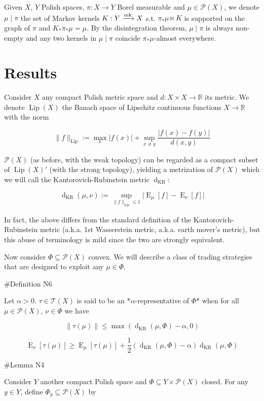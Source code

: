\documentclass[a4paper]{article}
\DeclareMathOperator{\E}{E}
\newcommand{\Reals}{\mathbb{R}}
\newcommand{\Abs}[1]{\lvert #1 \rvert}
\newcommand{\Norm}[1]{\lVert #1 \rVert}
\newcommand{\Markov}{\xrightarrow{\textnormal{mk}}}
\newcommand{\Prob}{\mathcal{P}}
\newcommand{\T}{\mathcal{T}}
\newcommand{\Lip}{\operatorname{Lip}}
\newcommand{\NormL}[1]{\Norm{#1}_{\operatorname{Lip}}}
\newcommand{\Dkr}{\operatorname{d}_{\text{KR}}}
\begin{document}
Given ${X}$, ${Y}$ Polish spaces, ${\pi: X \rightarrow Y}$ Borel measurable and ${\mu \in \Prob(X)}$, we denote ${\mu \mid \pi}$ the set of Markov kernels ${K: Y \Markov X}$ s.t. ${\pi_* \mu \ltimes K}$ is supported on the graph of ${\pi}$ and ${K_*\pi_* \mu = \mu}$. By the disintegration theorem, ${\mu \mid \pi}$ is always non-empty and any two kernels in ${\mu \mid \pi}$ coincide ${\pi_*\mu}$-almost everywhere.

\section{Results}

Consider ${X}$ any compact Polish metric space and ${d: X \times X \rightarrow \Reals}$ its metric. We denote ${\Lip(X)}$ the Banach space of Lipschitz continuous functions ${X \rightarrow \Reals}$ with the norm

$$\NormL{f}:=\max_{x} \Abs{f(x)} + \sup_{x \ne y}\frac{\Abs{f(x)-f(y)}}{d(x,y)}$$

${\Prob(X)}$ (as before, with the weak topology) can be regarded as a compact subset of ${\Lip(X)'}$ (with the strong topology), yielding a metrization of ${\Prob(X)}$ which we will call the Kantorovich-Rubinstein metric ${\Dkr}$:

$$\Dkr(\mu,\nu):=\sup_{\NormL{f} \leq 1} \Abs{\E_\mu[f] - \E_\nu[f]}$$

In fact, the above differs from the standard definition of the Kantorovich-Rubinstein metric (a.k.a. 1st Wasserstein metric, a.k.a. earth mover's metric), but this abuse of terminology is mild since the two are strongly equivalent.

Now consider ${\Phi \subseteq \Prob(X)}$ convex. We will describe a class of trading strategies that are designed to exploit any ${\mu \in \Phi}$.

\#Definition N6

Let $\alpha > 0$. ${\tau \in \T(X)}$ is said to be an *$\alpha$-representative of $\Phi$* when for all ${\mu \in \Prob(X)}$, ${\nu \in \Phi}$ we have

$$\Norm{\tau(\mu)} \leq \max(\Dkr(\mu,\Phi) - \alpha, 0)$$

$$\E_\nu[\tau(\mu)] \geq \E_\mu[\tau(\mu)] + \frac{1}{2}(\Dkr(\mu,\Phi) - \alpha)\Dkr(\mu,\Phi)$$

\#Lemma N4

Consider ${Y}$ another compact Polish space and ${\Phi \subseteq Y \times \Prob(X)}$ closed. For any ${y \in Y}$, define ${\Phi_y \subseteq \Prob(X)}$ by
\end{document}
